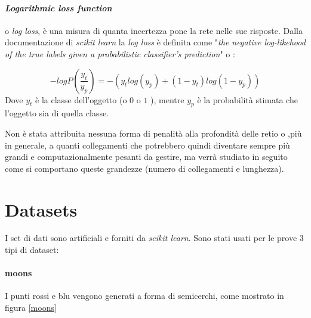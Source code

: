 \documentclass[12pt,a4paper]{report}
\begin{document}
\paragraph{\textit{Logarithmic loss function}} o \textit{log loss}, è una misura di quanta incertezza pone la rete nelle sue risposte. Dalla documentazione di \textit{scikit learn} la \textit{log loss} è definita come "\textit{the negative log-likehood of the true labels given a probabilistic classifier's prediction}" o :  

\begin{equation}
 -log P(\frac{y_{t}}{y_{p}}) = -(y_{t} log(y_{p}) + (1 - y_{t}) log(1 - y_{p}))
\end{equation}
Dove $y_{t}$ è la classe dell'oggetto (o $0$ o $1$ ), mentre $y_{p}$ è la probabilità stimata che l'oggetto sia di quella classe.

Non è stata attribuita nessuna forma di penalità alla profondità delle retio o ,più in generale, a quanti collegamenti  che potrebbero quindi diventare sempre più grandi e computazionalmente pesanti da gestire, ma verrà studiato in seguito come si comportano queste grandezze (numero di collegamenti e lunghezza). 

\section{Datasets}

I set di dati sono artificiali e forniti da \textit{scikit learn}. 
Sono stati usati per le prove 3 tipi di dataset:

\paragraph{moons} I punti rossi e blu vengono generati a forma di semicerchi, come mostrato in figura \ref{moons} 
\end{document}
